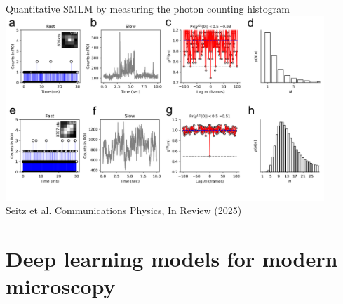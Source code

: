 \documentclass{beamer}					%
\begin{document}
\begin{frame}{Quantitative SMLM by measuring the photon counting histogram}
\includegraphics[width=12cm]{../../phd/spad/spad/media/Figure-1.png}
\\Seitz et al. Communications Physics, In Review (2025)
\end{frame}


\section{Deep learning models for modern microscopy}
\end{document}
